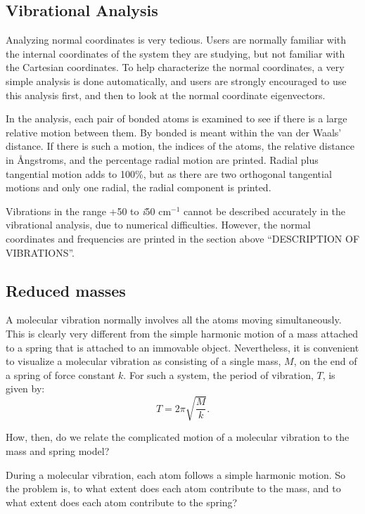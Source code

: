 \subsection{Vibrational Analysis}
Analyzing normal coordinates is very tedious.  Users  are  normally familiar
with the internal coordinates of the system they are studying, but not familiar
with the Cartesian coordinates.  To  help characterize the  normal
coordinates,  a very simple analysis is done automatically, and users are
strongly encouraged to use this analysis first,  and  then to look at the
normal coordinate eigenvectors.

In the analysis, each pair of bonded atoms is examined  to  see  if there  is
a  large  relative  motion  between them.  By bonded is meant  within the van der Waals' distance.  If there  is  such  a  motion,
the indices  of  the  atoms,  the  relative  distance  in \AA ngstroms, and the
percentage radial motion are printed.   Radial  plus  tangential  motion adds
to  100\%,  but  as there are two orthogonal tangential motions and only one
radial, the radial component is printed.

Vibrations in the range +50 to {\em i}50 cm$^{-1}$ cannot be described
accurately in the vibrational analysis, due to numerical difficulties. However,
the normal coordinates and frequencies are printed in the section above
``DESCRIPTION OF VIBRATIONS''.

\subsection{Reduced masses}
A molecular vibration normally involves all the atoms moving simultaneously.
This is clearly very different from the  simple harmonic motion of a mass
attached to a spring that is attached to an immovable object.  Nevertheless, it
is convenient to visualize a molecular vibration as consisting of a single
mass, $M$, on the end of a spring of force constant $k$. For such a  system,
the period of vibration, $T$, is given by:
$$
T=2\pi\sqrt{\frac{M}{k}}.
$$

How, then, do we relate the complicated motion of a molecular vibration to the
mass and spring model?

During a molecular vibration, each atom follows a simple harmonic motion. So
the problem is, to what extent does each atom contribute to the mass, and to
what extent does each atom contribute to the spring?

